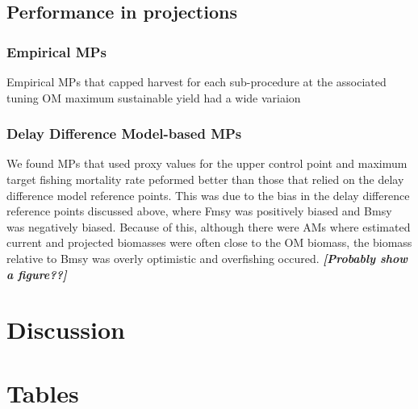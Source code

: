 \documentclass[]{article}
\begin{document}
\hypertarget{performance-in-projections}{%
\subsection{Performance in projections}\label{performance-in-projections}}

\hypertarget{empirical-mps}{%
\subsubsection{Empirical MPs}\label{empirical-mps}}

Empirical MPs that capped harvest for each sub-procedure at the
associated tuning OM maximum sustainable yield had a wide variaion

\hypertarget{delay-difference-model-based-mps}{%
\subsubsection{Delay Difference Model-based MPs}\label{delay-difference-model-based-mps}}

We found MPs that used proxy values for the upper control point
and maximum target fishing mortality rate peformed better than those that
relied on the delay difference model reference points. This was
due to the bias in the delay difference reference points discussed
above, where Fmsy was positively biased and Bmsy was negatively biased.
Because of this, although there were AMs where estimated current and
projected biomasses were often close to the OM biomass, the
biomass relative to Bmsy was overly optimistic and overfishing
occured. \textbf{\emph{{[}Probably show a figure??{]}}}

\hypertarget{discussion}{%
\section{Discussion}\label{discussion}}

\newpage

\hypertarget{tables}{%
\section{Tables}\label{tables}}
\end{document}
